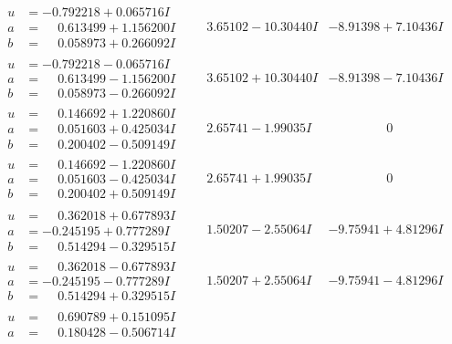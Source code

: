 \documentclass[1p]{elsarticle_modified}
\theoremstyle{definition}
\begin{document}
$$\begin{array}{c|c|c}
\begin{aligned}
u &= -0.792218 + 0.065716 I \\
a &= \phantom{-}0.613499 + 1.156200 I \\
b &= \phantom{-}0.058973 + 0.266092 I\end{aligned}
 & \phantom{-}3.65102 - 10.30440 I & -8.91398 + 7.10436 I \\ \hline\begin{aligned}
u &= -0.792218 - 0.065716 I \\
a &= \phantom{-}0.613499 - 1.156200 I \\
b &= \phantom{-}0.058973 - 0.266092 I\end{aligned}
 & \phantom{-}3.65102 + 10.30440 I & -8.91398 - 7.10436 I \\ \hline\begin{aligned}
u &= \phantom{-}0.146692 + 1.220860 I \\
a &= \phantom{-}0.051603 + 0.425034 I \\
b &= \phantom{-}0.200402 - 0.509149 I\end{aligned}
 & \phantom{-}2.65741 - 1.99035 I & \phantom{-0.000000 } 0 \\ \hline\begin{aligned}
u &= \phantom{-}0.146692 - 1.220860 I \\
a &= \phantom{-}0.051603 - 0.425034 I \\
b &= \phantom{-}0.200402 + 0.509149 I\end{aligned}
 & \phantom{-}2.65741 + 1.99035 I & \phantom{-0.000000 } 0 \\ \hline\begin{aligned}
u &= \phantom{-}0.362018 + 0.677893 I \\
a &= -0.245195 + 0.777289 I \\
b &= \phantom{-}0.514294 - 0.329515 I\end{aligned}
 & \phantom{-}1.50207 - 2.55064 I & -9.75941 + 4.81296 I \\ \hline\begin{aligned}
u &= \phantom{-}0.362018 - 0.677893 I \\
a &= -0.245195 - 0.777289 I \\
b &= \phantom{-}0.514294 + 0.329515 I\end{aligned}
 & \phantom{-}1.50207 + 2.55064 I & -9.75941 - 4.81296 I \\ \hline\begin{aligned}
u &= \phantom{-}0.690789 + 0.151095 I \\
a &= \phantom{-}0.180428 - 0.506714 I \\

\end{aligned}
\end{array}$$
\end{document}

